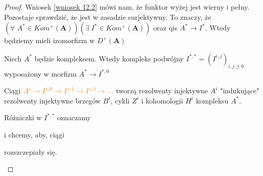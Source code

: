 \begin{proof}
  Wniosek \ref{wniosek 12.2} mówi nam, że funktor wyżej jest wierny i pełny. Pozostaje sprawdzić, że jest w zasadzie surjektywny. To znaczy, że $(\forall\;A^*\in Kom^+(\mathbf{A}))(\exists\;I^*\in Kom^+(\mathbf{A}))$ oraz qis $A^*\to I^*$. Wtedy będziemy mieli izomorfizm w $D^+(\mathbf{A})$

  \begin{definition}
    Niech $A^*$ będzie kompleksem. Wtedy kompleks podwójny $I^{*,*}=(I^{i,j})_{i,j\geq 0}$ wyposażony w morfizm $A^*\to I^{*,0}$

    \begin{center}\end{center}

    Ciągi $\color{orange}A^i\to I^{i,0}\to I^{i, 1}\to I^{i,2} \to ...$ tworzą rezolwenty injektywne $A^i$ "indukujące" rezolwenty injektywne brzegów $B^i$, cykli $Z^i$ i kohomologii $H^i$ kompleksu $A^*$. 


    Różniczki w $I^{*,*}$ oznaczamy
    \begin{center}\end{center}
    i chcemy, aby, ciągi 
    \begin{center}\end{center}
    rozszczepiały się.
  \end{definition}


\end{proof}
